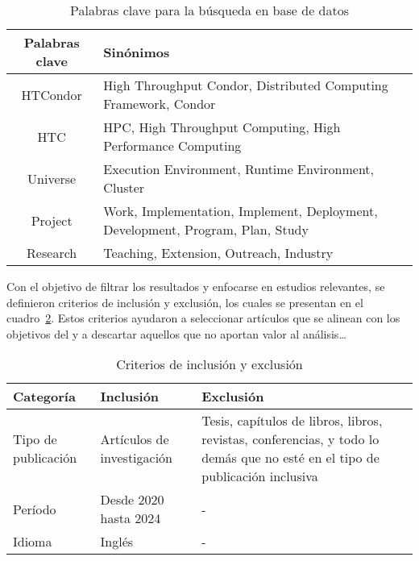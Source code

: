 \begin{table}[H]
	\centering
	\scriptsize
	\setlength{\tabcolsep}{4pt}
	\begin{tabular}{|c|p{11.5cm}|} %
		\hline
		\textbf{Palabras clave} & \textbf{Sinónimos}                                                             \\
		\hline
		HTCondor                & High Throughput Condor, Distributed Computing Framework, Condor                \\
		\hline
		HTC                     & HPC, High Throughput Computing, High Performance Computing                     \\
		\hline
		Universe                & Execution Environment, Runtime Environment, Cluster                            \\
		\hline
		Project                 & Work, Implementation, Implement, Deployment, Development, Program, Plan, Study \\
		\hline
		Research                & Teaching, Extension, Outreach, Industry                                        \\
		\hline
	\end{tabular}
	\caption{Palabras clave para la búsqueda en base de datos}
	\label{tab:keywords}
\end{table}



\noindent
Con el objetivo de filtrar los resultados y enfocarse en estudios relevantes, se definieron criterios de inclusión y exclusión, los cuales se presentan en el cuadro~\ref{table:criterios-inclusion-exclusion}. Estos criterios ayudaron a seleccionar artículos que se alinean con los objetivos del \SMS y a descartar aquellos que no aportan valor al análisis\dots

\begin{table}[H]
	\centering
	\caption{Criterios de inclusión y exclusión}
	\begin{tabular}{|p{3cm}|p{5cm}|p{6cm}|}
		\hline
		\textbf{Categoría}  & \textbf{Inclusión}         & \textbf{Exclusión}                                                                                                          \\
		\hline
		Tipo de publicación & Artículos de investigación & Tesis, capítulos de libros, libros, revistas, conferencias, y todo lo demás que no esté en el tipo de publicación inclusiva \\
		\hline
		Período             & Desde 2020 hasta 2024      & -                                                                                                                           \\
		\hline
		Idioma              & Inglés                     & -                                                                                                                           \\
		\hline
	\end{tabular}
	\label{table:criterios-inclusion-exclusion}
\end{table}




